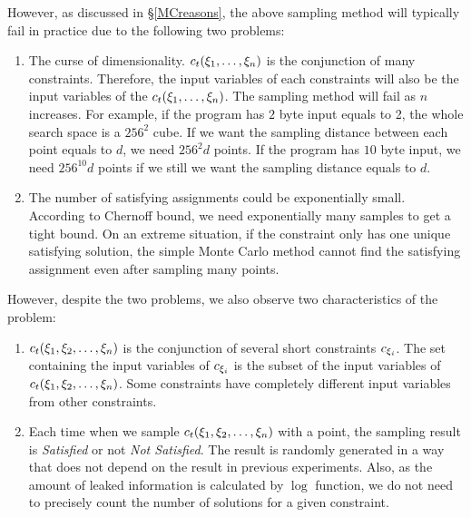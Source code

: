 However, as discussed in \S\ref{MCreasons}, the above sampling method will
typically fail in practice due to the following two problems:

\begin{enumerate}
      \item The curse of dimensionality. $c_t({{\xi}_{1}},\ldots,{{\xi}_{n}})$ is
            the conjunction of many constraints. Therefore, the input variables
            of each constraints will also be the input variables of the
            $c_t({{\xi}_{1}},\ldots,{{\xi}_{n}})$. The sampling method will fail
            as $n$ increases. For example, if the program has $2$ byte input
            equals to 2, the whole search space is a $256^2$ cube. If we want
            the sampling distance between each point equals to $d$, we need
            $256^2d$ points. If the program has $10$ byte input, we need
            $256^{10}d$ points if we still we want the sampling distance equals
            to $d$.

      \item The number of satisfying assignments could be exponentially small.
            According to Chernoff bound, we need exponentially many samples to
            get a tight bound. On an extreme situation, if the constraint only
            has one unique satisfying solution, the simple Monte Carlo method
            cannot find the satisfying assignment even after sampling many
            points.
\end{enumerate}

However, despite the two problems, we also observe two characteristics of the
problem:
\begin{enumerate}
      \item $c_t({{\xi}_{1}},{{\xi}_{2}},\ldots,{{\xi}_{n}})$ is the conjunction of
            several short constraints $c_{{\xi}_{i}}$. The set containing the
            input variables of $c_{{\xi}_{i}}$ is the subset of the input
            variables of $c_t({{\xi}_{1}},{{\xi}_{2}},\ldots,{{\xi}_{n}})$. Some
            constraints have completely different input variables from other
            constraints.

            \item Each time when we sample $c_t({{\xi}_{1}},{{\xi}_{2}},\ldots,{{\xi}_{n}})$
            with a point, the sampling result is \emph{Satisfied} or not \emph{Not Satisfied}.
            The result is randomly generated in a way that does not depend on the result in 
            previous experiments. Also, as the amount of leaked information is calculated
            by $\log$ function, we do not need to precisely count the number of solutions for
            a given constraint.

\end{enumerate}


